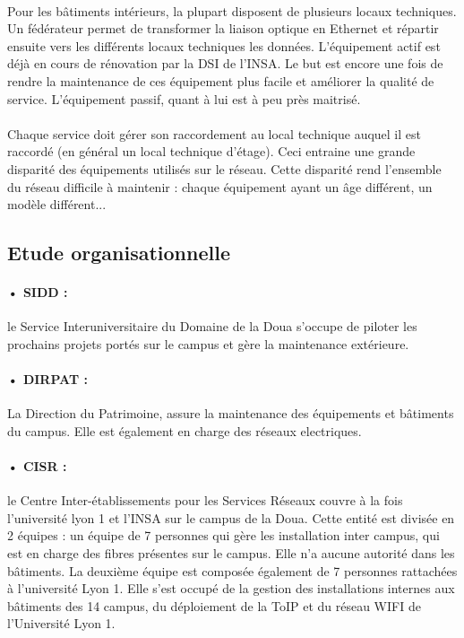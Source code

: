 \paragraph{} Pour les bâtiments intérieurs, la plupart disposent de plusieurs locaux techniques. Un fédérateur permet de transformer la liaison optique en Ethernet et répartir ensuite vers les différents locaux techniques les données. L'équipement actif est déjà en cours de rénovation par la DSI de l'INSA. Le but est encore une fois de rendre la maintenance de ces équipement plus facile et améliorer la qualité de service. L'équipement passif, quant à lui est à peu près maitrisé.

\paragraph{} Chaque service doit gérer son raccordement au local technique auquel il est raccordé (en général un local technique d'étage). Ceci entraine une grande disparité des équipements utilisés sur le réseau. Cette disparité rend l'ensemble du réseau difficile à maintenir : chaque équipement ayant un âge différent, un modèle différent...


\subsection{Etude organisationnelle}

\paragraph{• SIDD :} le Service Interuniversitaire du Domaine de la Doua s'occupe de piloter les prochains projets portés sur le campus et gère la maintenance extérieure.

\paragraph{• DIRPAT :} La Direction du Patrimoine, assure la maintenance des équipements et bâtiments du campus. Elle est également en charge des réseaux electriques.

\paragraph{• CISR :} le Centre Inter-établissements pour les Services Réseaux couvre à la fois l'université lyon 1 et l'INSA sur le campus de la Doua. Cette entité est divisée en 2 équipes : un équipe de 7 personnes qui gère les installation inter campus, qui est en charge des fibres présentes sur le campus. Elle n'a aucune autorité dans les bâtiments. La deuxième équipe est composée également de 7 personnes rattachées à l'université Lyon 1. Elle s'est occupé de la gestion des installations internes aux bâtiments des 14 campus, du déploiement de la ToIP et du réseau WIFI de l'Université Lyon 1.

